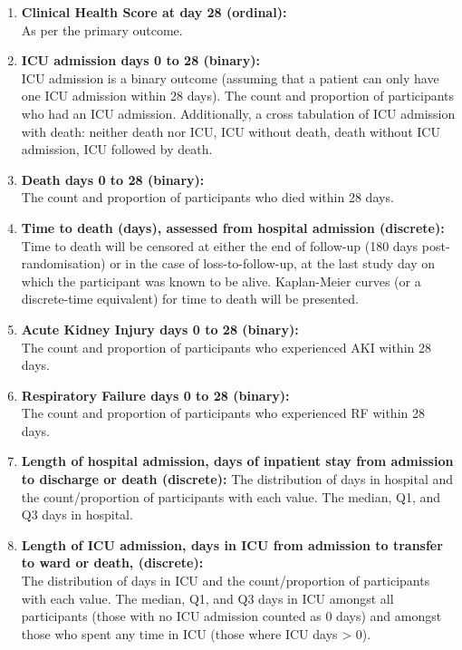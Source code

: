 \documentclass[11pt,parskip=half-]{scrartcl}
\begin{document}
\begin{enumerate}
    \item \textbf{Clinical Health Score at day 28 (ordinal):} \\
        As per the primary outcome.
    \item \textbf{ICU admission days 0 to 28 (binary):} \\
        ICU admission is a binary outcome (assuming that a patient can only have one ICU admission within 28 days). The count and proportion of participants who had an ICU admission. Additionally, a cross tabulation of ICU admission with death: neither death nor ICU, ICU without death, death without ICU admission, ICU followed by death.
    \item \textbf{Death days 0 to 28 (binary):} \\
        The count and proportion of participants who died within 28 days.
    \item \textbf{Time to death (days), assessed from hospital admission (discrete):} \\
        Time to death will be censored at either the end of follow-up (180 days post-randomisation) or in the case of loss-to-follow-up, at the last study day on which the participant was known to be alive. Kaplan-Meier curves (or a discrete-time equivalent) for time to death will be presented.
    \item \textbf{Acute Kidney Injury days 0 to 28 (binary):} \\
        The count and proportion of participants who experienced AKI within 28 days.
    \item \textbf{Respiratory Failure days 0 to 28 (binary):} \\
        The count and proportion of participants who experienced RF within 28 days.
    \item \textbf{Length of hospital admission, days of inpatient stay from admission to discharge or death (discrete):}
        The distribution of days in hospital and the count/proportion of participants with each value. The median, Q1, and Q3 days in hospital.
    \item \textbf{Length of ICU admission, days in ICU from admission to transfer to ward or death, (discrete):} \\
        The distribution of days in ICU and the count/proportion of participants with each value. The median, Q1, and Q3 days in ICU amongst all participants (those with no ICU admission counted as 0 days) and amongst those who spent any time in ICU (those where ICU days > 0).

\end{enumerate}
\end{document}
